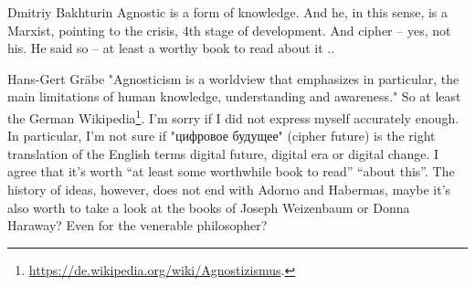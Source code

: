 \documentclass[11pt,a4paper]{article}
\begin{document}
Dmitriy Bakhturin Agnostic is a form of knowledge. And he, in this sense, is a
Marxist, pointing to the crisis, 4th stage of development. And cipher -- yes,
not his. He said so -- at least a worthy book to read about it ..

Hans-Gert Gräbe "Agnosticism is a worldview that emphasizes in particular, the
main limitations of human knowledge, understanding and awareness." So at least
the German
Wikipedia\footnote{\url{https://de.wikipedia.org/wiki/Agnostizismus}.}.  I'm
sorry if I did not express myself accurately enough. In particular, I’m not
sure if "цифровое будущее" (cipher future) is the right translation of the
English terms digital future, digital era or digital change. I agree that it’s
worth “at least some worthwhile book to read” “about this”. The history of
ideas, however, does not end with Adorno and Habermas, maybe it’s also worth
to take a look at the books of Joseph Weizenbaum or Donna Haraway? Even for
the venerable philosopher?

\ccnotice
\end{document}
